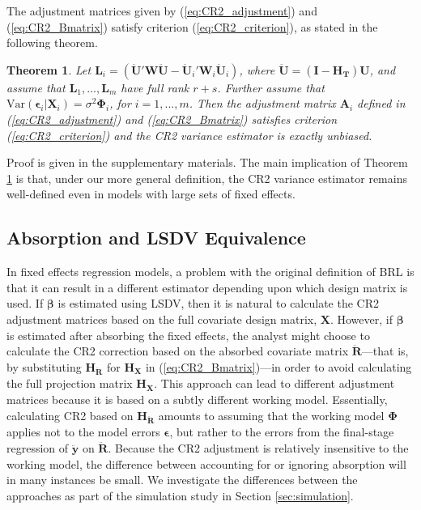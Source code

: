 \documentclass[12pt]{article}\usepackage[]{graphicx}\usepackage[]{color}
\newtheorem{thm}{Theorem}
\newcommand{\Var}{\text{Var}}
\newcommand{\bm}{\mathbf}
\newcommand{\bs}{\boldsymbol}
\begin{document}
The adjustment matrices given by (\ref{eq:CR2_adjustment}) and (\ref{eq:CR2_Bmatrix}) satisfy criterion (\ref{eq:CR2_criterion}), as stated in the following theorem.

\begin{thm}
\label{thm:BRL_FE}
Let $\bm{L}_i = \left(\bm{\ddot{U}}'\bm{W}\bm{\ddot{U}} - \bm{\ddot{U}}_i'\bm{W}_i\bm{\ddot{U}}_i\right)$, where $\bm{\ddot{U}} = \left(\bm{I} - \bm{H_T}\right)\bm{U}$, and assume that $\bm{L}_1,...,\bm{L}_m$ have full rank $r + s$. Further assume that $\Var\left(\bs\epsilon_i\left|\bm{X}_i\right.\right) = \sigma^2 \bs\Phi_i$, for $i = 1,...,m$. Then the adjustment matrix $\bm{A}_i$ defined in (\ref{eq:CR2_adjustment}) and (\ref{eq:CR2_Bmatrix}) satisfies criterion (\ref{eq:CR2_criterion}) and the CR2 variance estimator is exactly unbiased.
\end{thm}

Proof is given in the supplementary materials. The main implication of Theorem \ref{thm:BRL_FE} is that, under our more general definition, the CR2 variance estimator remains well-defined even in models with large sets of fixed effects.

\subsection{Absorption and LSDV Equivalence}

In fixed effects regression models, a problem with the original definition of BRL is that it can result in a different estimator depending upon which design matrix is used.
If $\bs\beta$ is estimated using LSDV, then it is natural to calculate the CR2 adjustment matrices based on the full covariate design matrix, $\bm{X}$. However, if $\bs\beta$ is estimated after absorbing the fixed effects, the analyst might choose to calculate the CR2 correction based on the absorbed covariate matrix $\bm{\ddot{R}}$---that is, by substituting $\bm{H_{\ddot{R}}}$ for $\bm{H_X}$ in (\ref{eq:CR2_Bmatrix})---in order to avoid calculating the full projection matrix $\bm{H_X}$. 
This approach can lead to different adjustment matrices because it is based on a subtly different working model. 
Essentially, calculating CR2 based on $\bm{H_{\ddot{R}}}$ amounts to assuming that the working model $\bs\Phi$ applies not to the model errors $\bs\epsilon$, but rather to the errors from the final-stage regression of $\bm{\ddot{y}}$ on $\bm{\ddot{R}}$.
Because the CR2 adjustment is relatively insensitive to the working model, the difference between accounting for or ignoring absorption will in many instances be small. 
We investigate the differences between the approaches as part of the simulation study in Section \ref{sec:simulation}.
\end{document}

